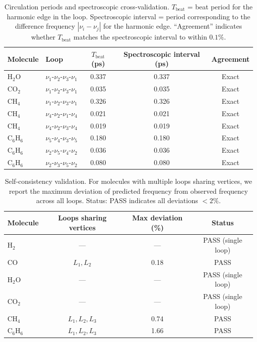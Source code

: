 \documentclass[11pt,a4paper]{article}
\theoremstyle{definition}
\theoremstyle{remark}
\begin{document}
\begin{table}[H]
\centering
\caption{Circulation periods and spectroscopic cross-validation. $T_{\mathrm{beat}}$ = beat period for the harmonic edge in the loop. Spectroscopic interval = period corresponding to the difference frequency $|\nu_i - \nu_j|$ for the harmonic edge. ``Agreement'' indicates whether $T_{\mathrm{beat}}$ matches the spectroscopic interval to within $0.1\%$.}
\label{tab:circulation}
\small
\begin{tabular}{@{}llccc@{}}
\toprule
Molecule & Loop & $T_{\mathrm{beat}}$ (ps) & Spectroscopic interval (ps) & Agreement \\
\midrule
H$_2$O & $\nu_1\text{-}\nu_2\text{-}\nu_3\text{-}\nu_1$ & 0.337 & 0.337 & Exact \\
\midrule
CO$_2$ & $\nu_1\text{-}\nu_2\text{-}\nu_3\text{-}\nu_1$ & 0.035 & 0.035 & Exact \\
\midrule
CH$_4$ & $\nu_1\text{-}\nu_2\text{-}\nu_3\text{-}\nu_1$ & 0.326 & 0.326 & Exact \\
CH$_4$ & $\nu_4\text{-}\nu_2\text{-}\nu_1\text{-}\nu_4$ & 0.021 & 0.021 & Exact \\
CH$_4$ & $\nu_4\text{-}\nu_2\text{-}\nu_3\text{-}\nu_4$ & 0.019 & 0.019 & Exact \\
\midrule
C$_6$H$_6$ & $\nu_5\text{-}\nu_4\text{-}\nu_3\text{-}\nu_5$ & 0.180 & 0.180 & Exact \\
C$_6$H$_6$ & $\nu_2\text{-}\nu_5\text{-}\nu_4\text{-}\nu_2$ & 0.036 & 0.036 & Exact \\
C$_6$H$_6$ & $\nu_2\text{-}\nu_3\text{-}\nu_5\text{-}\nu_2$ & 0.080 & 0.080 & Exact \\
\bottomrule
\end{tabular}
\end{table}

\begin{table}[H]
\centering
\caption{Self-consistency validation. For molecules with multiple loops sharing vertices, we report the maximum deviation of predicted frequency from observed frequency across all loops. Status: PASS indicates all deviations $< 2\%$.}
\label{tab:self_consistency}
\small
\begin{tabular}{@{}lccc@{}}
\toprule
Molecule & Loops sharing vertices & Max deviation (\%) & Status \\
\midrule
H$_2$     & ---       & ---   & PASS (single loop) \\
CO        & $L_1, L_2$ & 0.18 & PASS \\
H$_2$O    & ---       & ---   & PASS (single loop) \\
CO$_2$    & ---       & ---   & PASS (single loop) \\
CH$_4$    & $L_1, L_2, L_3$ & 0.74 & PASS \\
C$_6$H$_6$ & $L_1, L_2, L_3$ & 1.66 & PASS \\
\bottomrule
\end{tabular}
\end{table}
\end{document}
